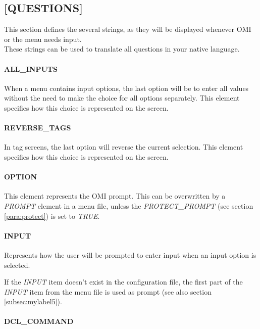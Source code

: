 \documentclass[a4paper]{book}
\begin{document}
\subsection{[QUESTIONS]}
\label{subsubsec:mylabel18}

This section defines the several strings, as they will be displayed whenever 
OMI or the menu needs input. \\
These strings can be used to translate all questions in your native 
language.

\paragraph{ALL{\_}INPUTS}
\label{para:mylabel3}

When a menu contains input options, the last option will be to enter all 
values without the need to make the choice for all options separately. This 
element specifies how this choice is represented on the screen.

\paragraph{REVERSE{\_}TAGS}

In tag screens, the last option will reverse the current selection. This 
element specifies how this choice is represented on the screen.

\paragraph{OPTION}
\label{para:option}

This element represents the OMI prompt. This can be overwritten by a 
\textsl{PROMPT} element in a menu file, unless the \textsl{PROTECT{\_}PROMPT} (see section 
\ref{para:protect}) is set to \textsl{TRUE}.

\paragraph{INPUT}
\label{para:input}

Represents how the user will be prompted to enter input when an input option 
is selected.

If the \textsl{INPUT} item doesn't exist in the configuration file, the first part of the \textsl{INPUT}
item from the menu file is used as prompt (see also section \ref{subsec:mylabel5}).

\paragraph{DCL{\_}COMMAND}
\end{document}
